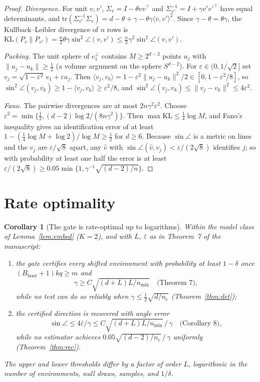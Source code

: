 \documentclass[11pt]{article}
\newtheorem{corollary}{Corollary}
\newcommand{\Bb}{B_{\mathrm{boot}}}
\begin{document}
\begin{proof}
\emph{Divergence.} For unit $v,v'$, $\Sigma_v=I-\theta vv^\top$ and $\Sigma_{v'}^{-1}=I+\gamma v'v'^\top$ have equal determinants, and $\mathrm{tr}(\Sigma_{v'}^{-1}\Sigma_v)=d-\theta+\gamma-\theta\gamma\langle v,v'\rangle^2$. Since $\gamma-\theta=\theta\gamma$, the Kullback--Leibler divergence of $n$ rows is $\mathrm{KL}(P_v\|P_{v'})=\tfrac n2\theta\gamma\sin^2\angle(v,v')\le\tfrac n2\gamma^2\sin^2\angle(v,v')$.

\emph{Packing.} The unit sphere of $e_1^\perp$ contains $M\ge2^{d-2}$ points $u_j$ with $\|u_j-u_k\|\ge\tfrac12$ (a volume argument on the sphere $S^{d-2}$). For $\varepsilon\in(0,1/\sqrt2]$ set $v_j=\sqrt{1-\varepsilon^2}\,e_1+\varepsilon u_j$. Then $\langle v_j,v_k\rangle=1-\varepsilon^2\|u_j-u_k\|^2/2\in[0,1-\varepsilon^2/8]$, so $\sin^2\angle(v_j,v_k)\ge1-\langle v_j,v_k\rangle\ge\varepsilon^2/8$, and $\sin^2\angle(v_j,v_k)\le\|v_j-v_k\|^2\le4\varepsilon^2$.

\emph{Fano.} The pairwise divergences are at most $2n\gamma^2\varepsilon^2$. Choose $\varepsilon^2=\min\{\tfrac12,(d-2)\log2/(8n\gamma^2)\}$. Then $\max\mathrm{KL}\le\tfrac14\log M$, and Fano's inequality gives an identification error of at least $1-(\tfrac14\log M+\log2)/\log M\ge\tfrac12$ for $d\ge6$. Because $\sin\angle$ is a metric on lines and the $v_j$ are $\varepsilon/\sqrt8$ apart, any $\hat v$ with $\sin\angle(\hat v,v_j)<\varepsilon/(2\sqrt8)$ identifies $j$; so with probability at least one half the error is at least $\varepsilon/(2\sqrt8)\ge0.05\min\{1,\gamma^{-1}\sqrt{(d-2)/n}\}$.
\end{proof}

\section{Rate optimality}

\begin{corollary}[The gate is rate-optimal up to logarithms]
\label{cor:opt}
Within the model class of Lemma~\ref{lem:embed} ($K=2$), and with $L$, $\bar\varepsilon$ as in Theorem~7 of the manuscript:
\begin{enumerate}
  \item[(a)] the gate certifies every shifted environment with probability at least $1-\delta$ once $(\Bb+1)kq\ge m$ and
  \[\gamma\ge C\sqrt{(d+L)L/n_{\min}}\quad\text{(Theorem~7)},\]
  while no test can do so reliably when $\gamma\le\tfrac12\sqrt{d/n_e}$ (Theorem~\ref{thm:det});
  \item[(b)] the certified direction is recovered with angle error
  \[\sin\angle\le4\bar\varepsilon/\gamma\le C\sqrt{(d+L)L/n_{\min}}\,/\,\gamma\quad\text{(Corollary~8)},\]
  while no estimator achieves $0.05\sqrt{(d-2)/n_e}\,/\,\gamma$ uniformly (Theorem~\ref{thm:rec}).
\end{enumerate}
The upper and lower thresholds differ by a factor of order $L$, logarithmic in the number of environments, null draws, samples, and $1/\delta$.
\end{corollary}
\end{document}

